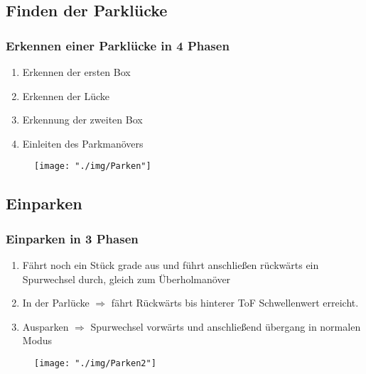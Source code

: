 \documentclass{beamer}
\begin{document}
	\subsection{Finden der Parklücke}
	
	\begin{frame}
		\frametitle{Erkennen einer Parklücke in 4 Phasen}
		
		\begin{enumerate}
			\item Erkennen der ersten Box
			\item Erkennen der Lücke
			\item Erkennung der zweiten Box
			\item Einleiten des Parkmanövers
		\end{enumerate}
		
		\begin{center}
			\begin{figure}[h]
				\texttt{[image: "./img/Parken"]}
				\label{fig:Parken1}
			\end{figure}
		\end{center}
	\end{frame}
	
	\subsection{Einparken}
	
	\begin{frame}
		\frametitle{Einparken in 3 Phasen}
		\begin{enumerate}
			\item Fährt noch ein Stück grade aus und führt anschließen rückwärts ein Spurwechsel durch, gleich zum Überholmanöver
			\item In der Parlücke $\Rightarrow$ fährt Rückwärts bis hinterer ToF Schwellenwert erreicht.
			\item Ausparken $\Rightarrow$ Spurwechsel vorwärts und anschließend übergang in normalen Modus
		\end{enumerate}
		
		\begin{center}
			\begin{figure}[h]
				\texttt{[image: "./img/Parken2"]}
				\label{fig:Parken2}
			\end{figure}
		\end{center}
		
	\end{frame}
	
\end{document}
